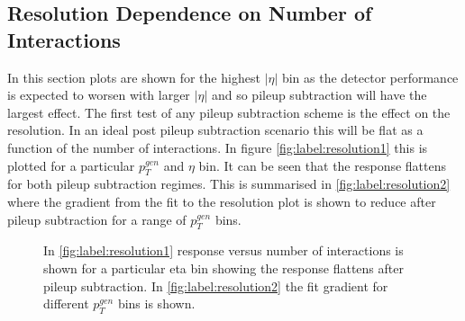 \subsection{Resolution Dependence on Number of Interactions}
In this section 
plots are shown for the highest $|\eta|$ bin as the detector performance is expected to 
worsen with larger $|\eta|$ and so pileup subtraction will have the largest effect. The first 
test of any pileup subtraction scheme is the effect on the resolution. In an ideal 
post pileup subtraction scenario this will be flat as a function of the number of 
interactions. In figure \ref{fig:label:resolution1} this is plotted for a particular $p^{gen}_T$ and $\eta$ bin. It 
can be seen that the response flattens for both pileup subtraction regimes. This is summarised 
in \ref{fig:label:resolution2} where the gradient from the fit to the resolution plot is shown to 
reduce after pileup subtraction for a range of $p^{gen}_T$ bins.  
\begin{figure}
\hfill
{}
\hfill
{}

\caption{In \ref{fig:label:resolution1} response versus number of interactions is shown for a particular eta bin showing 
the response flattens after pileup subtraction. In \ref{fig:label:resolution2} the fit gradient for different $p^{gen}_{T}$ bins 
is shown.}
\label{fig:label:resolution}
\end{figure}
